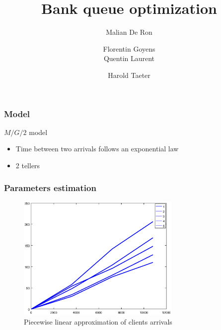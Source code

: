 \documentclass[10pt]{beamer}
\title{Bank queue optimization}
\author[Malian DR, Florentin G, Quentin L, Harlod T]{
  \small
  Malian De Ron
  \and
  Florentin Goyens
  \\
  Quentin Laurent
  \and
  Harold Taeter
}
\begin{document}
\begin{frame}
  \maketitle
\end{frame}

\begin{frame}
  \frametitle{Model}
  \begin{block}{$M/G/2$ model}
  \begin{itemize}
    \item Time between two arrivals follows an exponential law
    \item 2 tellers
    \end{itemize}
  \end{block}
\end{frame}


\begin{frame}
	\frametitle{Parameters estimation}

\begin{figure}
\centering
\includegraphics[width = 0.7\textwidth]{../report/images/lambdaApprox.eps}
\caption{Piecewise linear approximation of clients arrivals}
\end{figure}

\end{frame}
\end{document}
